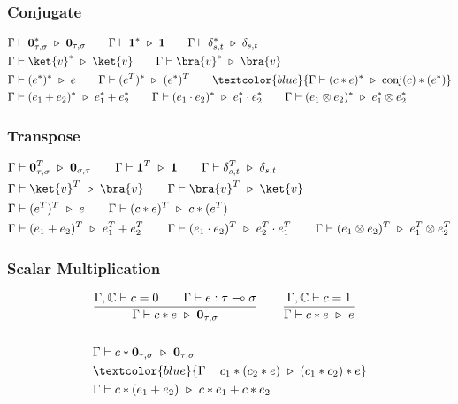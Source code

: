 \subsubsection*{Conjugate}
\begin{align*}
  & \Gamma \vdash \textbf{0}_{\tau, \sigma}^* \ \triangleright\ \textbf{0}_{\tau, \sigma}
  \qquad 
  \Gamma \vdash \mathbf{1}^* \ \triangleright\ \mathbf{1}
  \qquad 
  \Gamma \vdash \delta_{s,t}^* \ \triangleright\ \delta_{s,t}\\
  & \Gamma \vdash \ket{v}^* \ \triangleright\ \ket{v}
  \qquad 
  \Gamma \vdash \bra{v}^* \ \triangleright\ \bra{v} \\
  & \Gamma \vdash (e^*)^*\ \triangleright\ e
  \qquad 
  \Gamma \vdash (e^T)^* \ \triangleright\ (e^*)^T
  \qquad 
  \textcolor{blue}{\Gamma \vdash (c * e)^* \ \triangleright\ \textrm{conj}(c) * (e^*)}\\
  & \Gamma \vdash (e_1 + e_2)^* \ \triangleright\ e_1^* + e_2^* 
  \qquad \Gamma \vdash (e_1 \cdot e_2)^* \ \triangleright\ e_1^* \cdot e_2^* 
  \qquad \Gamma \vdash (e_1 \otimes e_2)^* \ \triangleright\ e_1^* \otimes e_2^*
\end{align*}

\subsubsection*{Transpose}
\begin{align*}
  & \Gamma \vdash \textbf{0}_{\tau, \sigma}^T \ \triangleright\ \textbf{0}_{\sigma, \tau} 
  \qquad \Gamma \vdash \mathbf{1}^T \ \triangleright\ \mathbf{1}
  \qquad \Gamma \vdash \delta_{s,t}^T \ \triangleright\ \delta_{s,t} \\
  & \Gamma \vdash \ket{v}^T \ \triangleright\ \bra{v} 
  \qquad \Gamma \vdash \bra{v}^T \ \triangleright\ \ket{v} \\
  & \Gamma \vdash (e^T)^T \ \triangleright\ e
  \qquad \Gamma \vdash (c * e)^T \ \triangleright\ c * (e^T)\\
  & \Gamma \vdash (e_1 + e_2)^T \ \triangleright\ e_1^T + e_2^T 
  \qquad \Gamma \vdash (e_1 \cdot e_2)^T \ \triangleright\ e_2^T \cdot e_1^T 
  \qquad \Gamma \vdash (e_1 \otimes e_2)^T \ \triangleright\ e_1^T \otimes e_2^T
\end{align*}


\subsubsection*{Scalar Multiplication}
\begin{align*}
  & \frac{\Gamma, \mathbb{C} \vdash c = 0 \qquad \Gamma \vdash e : \tau \multimap \sigma}{\Gamma \vdash c * e \ \triangleright\ \textbf{0}_{\tau, \sigma}}
  \qquad 
  \frac{\Gamma, \mathbb{C} \vdash c = 1 }{\Gamma \vdash c * e \ \triangleright\ e}\\
  &\ \\
  & \Gamma \vdash c * \mathbf{0}_{\tau, \sigma} \ \triangleright\ \mathbf{0}_{\tau, \sigma} \\
  & \textcolor{blue}{\Gamma \vdash c_1 * (c_2 * e) \ \triangleright\ (c_1 * c_2) * e} \\
  & \Gamma \vdash c * (e_1 + e_2) \ \triangleright\ c * e_1 + c * e_2
\end{align*}

